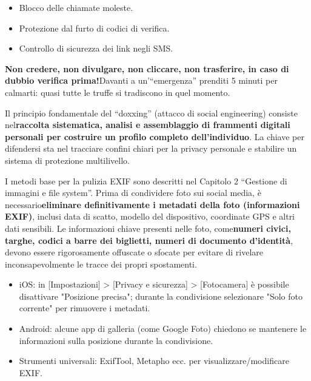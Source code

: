 
\begin{itemize}
  \item Blocco delle chiamate moleste.
  \item Protezione dal furto di codici di verifica.
  \item Controllo di sicurezza dei link negli SMS.
\end{itemize}


\textbf{Non credere, non divulgare, non cliccare, non trasferire, in caso di dubbio verifica prima!}Davanti a un'“emergenza” prenditi 5 minuti per calmarti: quasi tutte le truffe si tradiscono in quel momento.


Il principio fondamentale del “doxxing” (attacco di social engineering) consiste nel\textbf{raccolta sistematica, analisi e assemblaggio di frammenti digitali personali per costruire un profilo completo dell'individuo}. La chiave per difendersi sta nel tracciare confini chiari per la privacy personale e stabilire un sistema di protezione multilivello.


I metodi base per la pulizia EXIF sono descritti nel Capitolo 2 “Gestione di immagini e file system”. Prima di condividere foto sui social media, è necessario\textbf{eliminare definitivamente i metadati della foto (informazioni EXIF)}, inclusi data di scatto, modello del dispositivo, coordinate GPS e altri dati sensibili. Le informazioni chiave presenti nelle foto, come\textbf{numeri civici, targhe, codici a barre dei biglietti, numeri di documento d'identità}, devono essere rigorosamente offuscate o sfocate per evitare di rivelare inconsapevolmente le tracce dei propri spostamenti.

\begin{itemize}
  \item iOS: in [Impostazioni] > [Privacy e sicurezza] > [Fotocamera] è possibile disattivare "Posizione precisa"; durante la condivisione selezionare "Solo foto corrente" per rimuovere i metadati.
  \item Android: alcune app di galleria (come Google Foto) chiedono se mantenere le informazioni sulla posizione durante la condivisione.
  \item Strumenti universali: ExifTool, Metapho ecc. per visualizzare/modificare EXIF.
\end{itemize}


